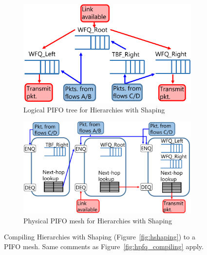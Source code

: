 
\begin{figure}[!t]
  \begin{subfigure}[b]{0.5\textwidth}
  \includegraphics[width=\textwidth]{pifo_hshaping_logical.pdf}
  \caption{Logical PIFO tree for Hierarchies with Shaping}
  \label{fig:hshaping_path}
  \end{subfigure}
  \begin{subfigure}[b]{0.5\textwidth}
  \includegraphics[width=\textwidth]{pifo_hshaping_physical.pdf}
  \caption{Physical PIFO mesh for Hierarchies with Shaping}
  \label{fig:hshaping_mesh}
  \end{subfigure}
  \caption{Compiling Hierarchies with Shaping (Figure~\ref{fig:hshaping}) to a PIFO mesh. Same comments as Figure~\ref{fig:hpfq_compiling} apply.}
\end{figure}


